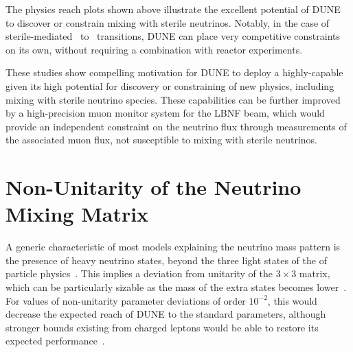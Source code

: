 The physics reach plots shown above illustrate the excellent potential of DUNE to discover or constrain mixing with sterile neutrinos. Notably, in the case of sterile-mediated \numu~to \nue~transitions, DUNE can place very competitive constraints on its own, without requiring a combination with reactor experiments. 

These studies show compelling motivation for DUNE to deploy a highly-capable   given its high potential for discovery or constraining of new physics, including mixing with sterile neutrino species. These capabilities can be further improved by a high-precision muon monitor system for the LBNF beam, which would provide an independent constraint on the neutrino flux through measurements of the associated muon flux, not susceptible to mixing with sterile neutrinos.




\section{Non-Unitarity of the Neutrino Mixing Matrix}
\label{sec:nonUnitarity}
A generic characteristic of most models explaining the neutrino mass
pattern is the presence of heavy neutrino states, beyond the
three light states of the   of particle
physics~\cite{Minkowski:1977sc,Mohapatra:1979ia,Yanagida:1979as,GellMann:1980vs}. This implies a deviation from unitarity of the $3\times3$  matrix, which can be particularly sizable %
as the mass of the extra states becomes lower~\cite{Mohapatra:1986bd,Akhmedov:1995vm,Akhmedov:1995ip,Malinsky:2005bi}.
For values of non-unitarity parameter deviations of order $10^{-2}$, this would decrease the expected reach of DUNE to the standard parameters, although stronger bounds existing from charged leptons would be able to restore its expected performance~\cite{Blennow:2016jkn,Escrihuela:2016ube}.

